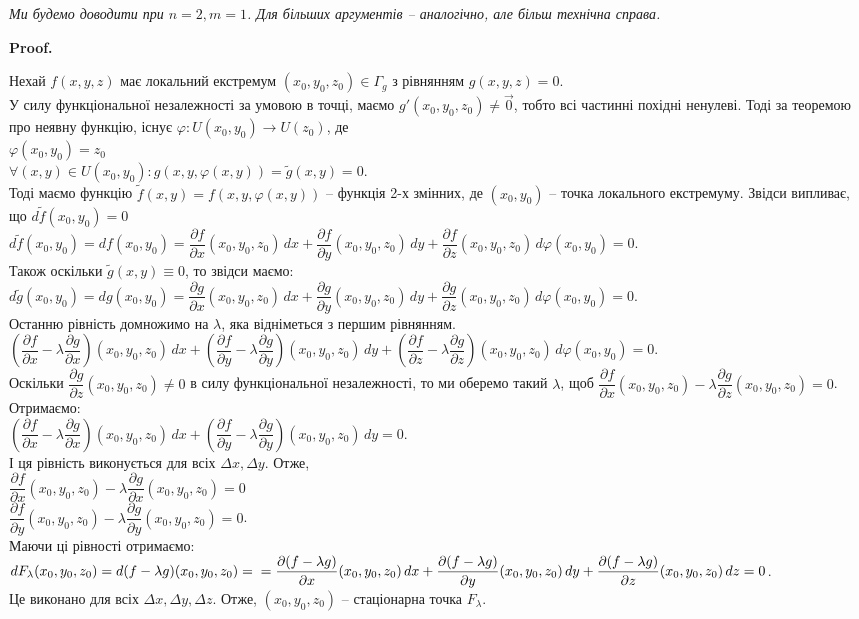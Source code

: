 \documentclass[a4paper, 10pt]{article}
\makeatletter
\def\departial#1#2{\dfrac{\partial {#1}}{\partial {#2}}}
\theoremstyle{theoremdd}
\theoremstyle{theoremdd}
\theoremstyle{theoremdd}
\theoremstyle{theoremdd}
\theoremstyle{theoremdd}
\theoremstyle{theoremdd}
\theoremstyle{theoremdd}
\theoremstyle{theoremdd}
\theoremstyle{theoremdd}
\renewenvironment{proof}[1][Proof.\\]{\par
\pushQED{\hfill \qed}%
\normalfont \topsep6\p@\@plus6\p@\relax
\trivlist
\item\relax
{\bfseries
#1\@addpunct{.}}\hspace\labelsep\ignorespaces
}{%
\popQED\endtrivlist\@endpefalse
}
\makeatother
\begin{document}
\textit{Ми будемо доводити при $n = 2, m = 1$. Для більших аргументів -- аналогічно, але більш технічна справа.}

\begin{proof}
Нехай $f(x,y,z)$ має локальний екстремум $(x_0,y_0,z_0) \in \Gamma_g$ з рівнянням $g(x,y,z) = 0$.\\
У силу функціональної незалежності за умовою в точці, маємо $g'(x_0,y_0,z_0) \neq \vec{0}$, тобто всі частинні похідні ненулеві. Тоді за теоремою про неявну функцію, існує $\varphi \colon U(x_0,y_0) \to U(z_0)$, де\\
$\varphi(x_0,y_0) = z_0$\\
$\forall (x,y) \in U(x_0,y_0): g(x,y,\varphi(x,y)) = \tilde{g}(x,y) = 0$.\\
Тоді маємо функцію $\tilde{f}(x,y) = f(x,y,\varphi(x,y))$ -- функція 2-х змінних, де $(x_0,y_0)$ -- точка локального екстремуму. Звідси випливає, що $d \tilde{f}(x_0,y_0) = 0$\\
$d\tilde{f}(x_0,y_0) = df(x_0,y_0) = \departial{f}{x}(x_0,y_0,z_0)\,dx + \departial{f}{y}(x_0,y_0,z_0)\,dy + \departial{f}{z}(x_0,y_0,z_0)\,d\varphi(x_0,y_0) = 0$.\\
Також оскільки $\tilde{g}(x,y) \equiv 0$, то звідси маємо:\\
$d\tilde{g}(x_0,y_0) = dg(x_0,y_0) = \departial{g}{x}(x_0,y_0,z_0)\,dx + \departial{g}{y}(x_0,y_0,z_0)\,dy + \departial{g}{z}(x_0,y_0,z_0)\,d\varphi(x_0,y_0) = 0$.\\
Останню рівність домножимо на $\lambda$, яка відніметься з першим рівнянням.\\
$\left( \departial{f}{x} - \lambda \departial{g}{x} \right)(x_0,y_0,z_0)\,dx + \left( \departial{f}{y} - \lambda \departial{g}{y} \right)(x_0,y_0,z_0)\,dy + \left( \departial{f}{z} - \lambda \departial{g}{z} \right)(x_0,y_0,z_0)\,d\varphi(x_0,y_0) = 0$.\\
Оскільки $\departial{g}{z}(x_0,y_0,z_0) \neq 0$ в силу функціональної незалежності, то ми оберемо такий $\lambda$, щоб $\departial{f}{x}(x_0,y_0,z_0) - \lambda \departial{g}{z}(x_0,y_0,z_0) = 0$. Отримаємо:\\
$\left( \departial{f}{x} - \lambda \departial{g}{x} \right)(x_0,y_0,z_0)\,dx + \left( \departial{f}{y} - \lambda \departial{g}{y} \right)(x_0,y_0,z_0)\,dy = 0$.\\
І ця рівність виконується для всіх $\Delta x, \Delta y$. Отже,\\
$\departial{f}{x}(x_0,y_0,z_0) - \lambda \departial{g}{x}(x_0,y_0,z_0) = 0$\\
$\departial{f}{y}(x_0,y_0,z_0) - \lambda \departial{g}{y}(x_0,y_0,z_0) = 0$.\\
Маючи ці рівності отримаємо:\\
$dF_{\lambda}(x_0,y_0,z_0) = d(f-\lambda g)(x_0,y_0,z_0) = \\ = \departial{(f-\lambda g)}{x}(x_0,y_0,z_0)\,dx + \departial{(f-\lambda g)}{y}(x_0,y_0,z_0)\,dy + \departial{(f-\lambda g)}{z}(x_0,y_0,z_0)\,dz = 0$.\\
Це виконано для всіх $\Delta x, \Delta y, \Delta z$. Отже, $(x_0,y_0,z_0)$ -- стаціонарна точка $F_\lambda$.
\end{proof}
\end{document}
